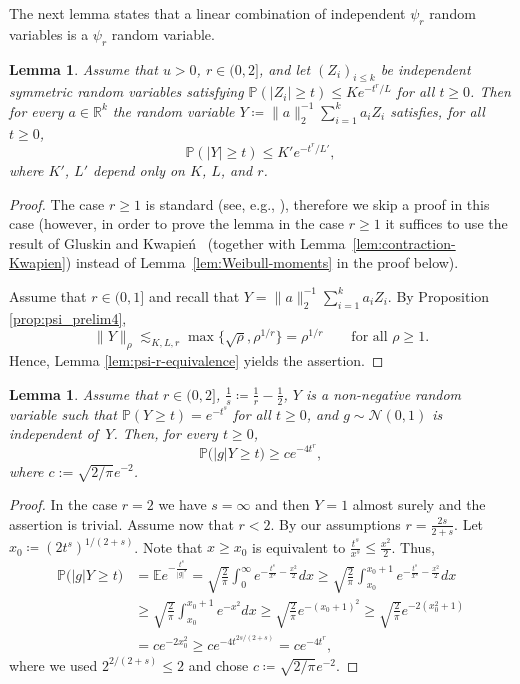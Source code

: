 \documentclass[a4paper]{amsart}
\newtheorem{lemma}[theorem]{Lemma}
\theoremstyle{definition}
\theoremstyle{remark}
\numberwithin{equation}{section}
\newcommand*{\RR}{\mathbb{R}}
\newcommand*{\EE}{\mathbb{E}}
\newcommand*{\PP}{\mathbb{P}}
\newcommand*{\prho}{\rho} %
\begin{document}
The next lemma states that a linear combination of independent $\psi_r$ random variables is a $\psi_r$ random variable.

\begin{lemma}	\label{lem:psi_prelim5}
	Assume that $u>0$, $r\in (0,2]$,
	and let $(Z_i)_{i\le k}$ be independent symmetric random variables satisfying  $\PP(|Z_i|\ge t) \le Ke^{-t^r/L}$ for all $t\ge 0$.
	Then for every $a\in \RR^k$
	the  random variable $Y\coloneqq \|a\|_2^{-1}\sum_{i=1}^k a_iZ_i$ satisfies, for all $t\ge 0$,
	$$\PP(|Y|\ge t) \le K'e^{-t^r/L'},$$
	where $K'$, $L'$ depend only on $K$, $L$, and $r$.
\end{lemma}

\begin{proof}
	The case $r\ge 1$ is standard (see, e.g., \cite[Theorem~1.2.5]{CGLP2012}), therefore we skip a proof in this case
	(however, in order to prove the lemma in the case $r\ge 1$ it suffices to use the result of Gluskin and Kwapie{\'n}~\cite{GluskinKwapien95} (together with Lemma~\ref{lem:contraction-Kwapien}) instead of Lemma~\ref{lem:Weibull-moments} in the proof below).
	
	Assume that $r\in (0,1]$ and recall that $Y=\|a\|_2^{-1}\sum_{i=1}^k a_iZ_i$. By Proposition \ref{prop:psi_prelim4},
	\[
		\|Y\|_{\prho{}} \lesssim_{K,L,r} \max\{ \sqrt{\prho{}} , \prho{}^{1/r} \} = \prho{}^{1/r} \qquad \text{for all } \prho{} \ge1.
	\]
	Hence, Lemma \ref{lem:psi-r-equivalence} yields the assertion.
\end{proof}

\begin{lemma} \label{lem:psi_prelim7}
	Assume that $r\in(0,2]$, $\frac{1}{s}\coloneqq\frac{1}{r}-\frac 12$,
	$Y$ is a non-negative random variable such that $\PP(Y\ge t)=e^{-t^s}$ for all  $t\ge 0$,
	and $g\sim \mathcal{N}(0,1)$ is independent of~$Y$.
	Then, for every $t\ge 0$,
	\[
		\PP\bigl(|g|Y\ge t\bigr)\ge c e^{-4t^r},
	\]
	where $c:=\sqrt{2/\pi}e^{-2}$.
\end{lemma}

\begin{proof}
	 In the case $r=2$ we have $s=\infty$ and then $Y=1$ almost surely and the assertion is trivial. Assume now that $r<2$. By our assumptions $r=\frac{2s}{2+s}$.
	Let $x_0\coloneqq(2t^s)^{1/(2+s)}$.
	Note that  $x\ge x_0$ is equivalent to $\frac{t^s}{x^s}\le \frac{x^2}2$.
	Thus,
	\begin{align*} 
		\PP\bigl(|g|Y\ge t\bigr)
		&=\EE e^{-\frac{t^s}{|g|^s}} = \sqrt{\frac 2{\pi}} \int_0^\infty e^{-\frac{t^s}{x^s}-\frac{x^2}2} dx
		\ge  \sqrt{\frac 2{\pi}} \int_{x_0}^{x_0+1} e^{-\frac{t^s}{x^s}-\frac{x^2}2} dx
		\\ &
		\ge \sqrt{\frac 2{\pi}} \int_{x_0}^{x_0+1} e^{-x^2} dx
		\ge \sqrt{\frac 2{\pi}} e^{-(x_0+1)^2}
		\ge \sqrt{\frac 2{\pi}} e^{-2(x_0^2+1)}
		\\ &
		= c e^{-2x_0^2} \ge ce^{-4t^{2s/(2+s)}} = ce^{-4t^r},
	\end{align*}
	where we used $2^{{2/(2+s)}}\leq 2$ and chose $c\coloneqq\sqrt{2/\pi}e^{-2}$.
	\end{proof}
\end{document}
